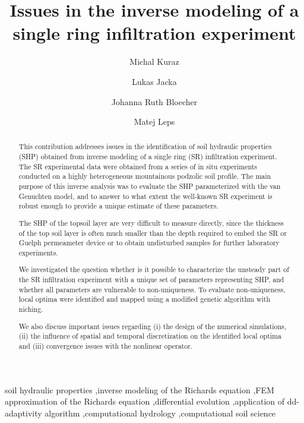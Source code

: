 \documentclass[review]{elsarticle}
\begin{document}
\begin{frontmatter}

\title{Issues in the inverse modeling of a single ring infiltration experiment}

\author[autor1]{Michal Kuraz}

\author[autor1]{Lukas Jacka}

\author[autor1]{Johanna Ruth Bloecher}

\author[autor2]{Matej Leps}



\address[autor1]{Czech University of Life Sciences Prague, Faculty of Environmental Sciences, Department of Water Resources and Environmental Modeling}

\address[autor2]{Czech Technical University in Prague, Faculty of Civil Engineering, Department of Mechanics}

\begin{abstract}
This contribution addresses issues in the identification of soil hydraulic properties (SHP) obtained from inverse modeling of a single ring (SR) infiltration experiment. 
The SR experimental  data  were obtained from a series of in situ experiments conducted on a highly heterogeneous mountainous podzolic soil profile. 
The main purpose of this inverse analysis was to evaluate the SHP parameterized with the van Genuchten model, and to answer to what extent the well-known SR experiment is robust enough to provide a unique estimate of these parameters.

The SHP of the topsoil layer are very difficult to measure directly, since the thickness of the top soil layer is often much smaller than the depth required to embed the SR or Guelph permeameter device or to obtain undisturbed samples for further laboratory experiments.


We investigated the question whether is it possible to characterize the unsteady part of the SR infiltration experiment with a unique set of parameters representing  SHP, and whether all parameters are vulnerable to non-uniqueness. To evaluate non-uniqueness, local optima were identified and mapped using a modified genetic algorithm with niching.   

We also discuss important issues regarding (i) the design of the numerical simulations, (ii) the influence of spatial and temporal discretization on the identified local optima and (iii) convergence issues with the nonlinear operator. 
\end{abstract}

\begin{keyword}
soil hydraulic properties \sep inverse modeling of the Richards equation \sep FEM approximation of the Richards equation \sep differential evolution \sep application of dd-adaptivity algorithm \sep computational hydrology \sep computational soil science


\end{keyword}

\end{frontmatter}
\end{document}
